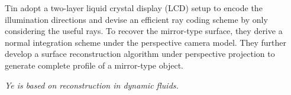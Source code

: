 \dagg Tin \etal \cite{tin20163d} adopt a two-layer liquid crystal display (LCD) setup to encode the illumination directions and devise an efficient ray coding scheme by only considering the useful rays. To recover the mirror-type surface, they derive a normal integration scheme under the perspective camera model. They further develop a surface reconstruction algorithm under perspective projection to generate complete profile of a mirror-type object.

\textit{Ye \etal \cite{ye2012angular} is based on reconstruction in dynamic fluids.}